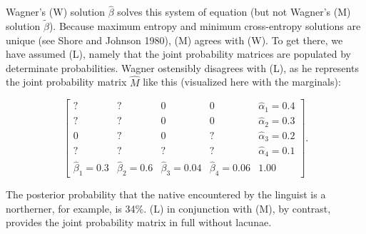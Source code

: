 \documentclass[11pt]{article}
\begin{document}



Wagner's (W) solution $\hat{\beta}$ solves this system of equation
(but not Wagner's (M) solution $\tilde{\beta}$). Because maximum
entropy and minimum cross-entropy solutions are unique (see
Shore and Johnson 1980), (M) agrees with (W). To get there, we
have assumed (L), namely that the joint probability matrices are
populated by determinate probabilities. Wagner ostensibly disagrees
with (L), as he represents the joint probability matrix $\hat{M}$ like
this (visualized here with the marginals):

\begin{equation}
  \label{eq:p8}
      \left[
      \begin{array}{ccccc}
        ? & ? & 0 & 0 & \hat{\alpha}_{1}=0.4 \\
        ? & ? & 0 & 0 & \hat{\alpha}_{2}=0.3 \\
        0 & ? & 0 & ? & \hat{\alpha}_{3}=0.2 \\
        ? & ? & ? & ? & \hat{\alpha}_{4}=0.1 \\
        \hat{\beta}_{1}=0.3 & \hat{\beta}_{2}=0.6 & \hat{\beta}_{3}=0.04 & \hat{\beta}_{4}=0.06 & 1.00
      \end{array}
\right].
\end{equation}

The posterior probability that the native encountered by the linguist
is a northerner, for example, is 34\%. (L) in conjunction with (M), by
contrast, provides the joint probability matrix in full without
lacunae.
\end{document}
